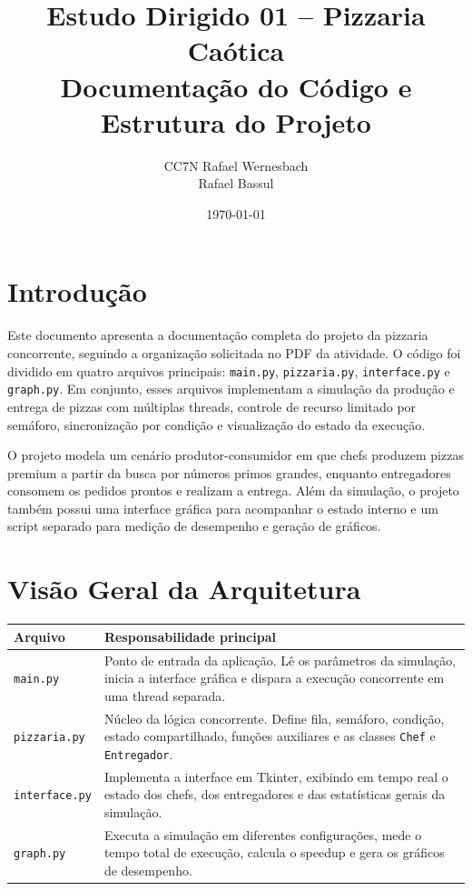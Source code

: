 \documentclass[12pt,a4paper]{article}
\title{\textbf{Estudo Dirigido 01 -- Pizzaria Ca\'otica}\\[0.5em]
\large Documenta\c{c}\~ao do C\'odigo e Estrutura do Projeto}
\author{
    CC7N
Rafael Wernesbach\\
Rafael Bassul\\
}
\date{\today}
\begin{document}
\maketitle

\section{Introdu\c{c}\~ao}
Este documento apresenta a documenta\c{c}\~ao completa do projeto da pizzaria concorrente, seguindo a organiza\c{c}\~ao solicitada no PDF da atividade. O c\'odigo foi dividido em quatro arquivos principais:
\texttt{main.py}, \texttt{pizzaria.py}, \texttt{interface.py} e \texttt{graph.py}. Em conjunto, esses arquivos implementam a simula\c{c}\~ao da produ\c{c}\~ao e entrega de pizzas com m\'ultiplas threads, controle de recurso limitado por sem\'aforo, sincroniza\c{c}\~ao por condi\c{c}\~ao e visualiza\c{c}\~ao do estado da execu\c{c}\~ao.

O projeto modela um cen\'ario produtor-consumidor em que chefs produzem pizzas premium a partir da busca por n\'umeros primos grandes, enquanto entregadores consomem os pedidos prontos e realizam a entrega. Al\'em da simula\c{c}\~ao, o projeto tamb\'em possui uma interface gr\'afica para acompanhar o estado interno e um script separado para medi\c{c}\~ao de desempenho e gera\c{c}\~ao de gr\'aficos.

\section{Vis\~ao Geral da Arquitetura}
\begin{longtable}{>{\raggedright\arraybackslash}p{} >{\raggedright\arraybackslash}p{}}
\toprule
\textbf{Arquivo} & \textbf{Responsabilidade principal} \\
\midrule
\endhead
\texttt{main.py} & Ponto de entrada da aplica\c{c}\~ao. L\^e os par\^ametros da simula\c{c}\~ao, inicia a interface gr\'afica e dispara a execu\c{c}\~ao concorrente em uma thread separada. \\
\texttt{pizzaria.py} & N\'ucleo da l\'ogica concorrente. Define fila, sem\'aforo, condi\c{c}\~ao, estado compartilhado, fun\c{c}\~oes auxiliares e as classes \texttt{Chef} e \texttt{Entregador}. \\
\texttt{interface.py} & Implementa a interface em Tkinter, exibindo em tempo real o estado dos chefs, dos entregadores e das estat\'isticas gerais da simula\c{c}\~ao. \\
\texttt{graph.py} & Executa a simula\c{c}\~ao em diferentes configura\c{c}\~oes, mede o tempo total de execu\c{c}\~ao, calcula o speedup e gera os gr\'aficos de desempenho. \\
\bottomrule
\end{longtable}
\end{document}
